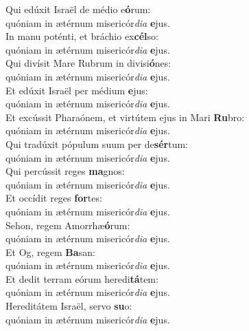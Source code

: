 \evenverse Qui edúxit Israël de médio e\textbf{ó}rum:~\*\\
\evenverse quóniam in ætérnum misericór\textit{di}\textit{a} \textbf{e}jus.\\
\oddverse In manu poténti, et bráchio ex\textbf{cél}so:~\*\\
\oddverse quóniam in ætérnum misericór\textit{di}\textit{a} \textbf{e}jus.\\
\evenverse Qui divísit Mare Rubrum in divisi\textbf{ó}nes:~\*\\
\evenverse quóniam in ætérnum misericór\textit{di}\textit{a} \textbf{e}jus.\\
\oddverse Et edúxit Israël per médium \textbf{e}jus:~\*\\
\oddverse quóniam in ætérnum misericór\textit{di}\textit{a} \textbf{e}jus.\\
\evenverse Et excússit Pharaónem, et virtútem ejus in Mari \textbf{Ru}bro:~\*\\
\evenverse quóniam in ætérnum misericór\textit{di}\textit{a} \textbf{e}jus.\\
\oddverse Qui tradúxit pópulum suum per de\textbf{sér}tum:~\*\\
\oddverse quóniam in ætérnum misericór\textit{di}\textit{a} \textbf{e}jus.\\
\evenverse Qui percússit reges \textbf{ma}gnos:~\*\\
\evenverse quóniam in ætérnum misericór\textit{di}\textit{a} \textbf{e}jus.\\
\oddverse Et occídit reges \textbf{for}tes:~\*\\
\oddverse quóniam in ætérnum misericór\textit{di}\textit{a} \textbf{e}jus.\\
\evenverse Sehon, regem Amorrhæ\textbf{ó}rum:~\*\\
\evenverse quóniam in ætérnum misericór\textit{di}\textit{a} \textbf{e}jus.\\
\oddverse Et Og, regem \textbf{Ba}san:~\*\\
\oddverse quóniam in ætérnum misericór\textit{di}\textit{a} \textbf{e}jus.\\
\evenverse Et dedit terram eórum heredi\textbf{tá}tem:~\*\\
\evenverse quóniam in ætérnum misericór\textit{di}\textit{a} \textbf{e}jus.\\
\oddverse Hereditátem Israël, servo \textbf{su}o:~\*\\
\oddverse quóniam in ætérnum misericór\textit{di}\textit{a} \textbf{e}jus.\\
